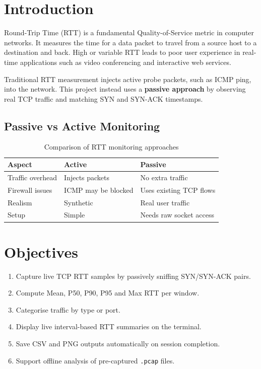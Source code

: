 \documentclass[12pt,a4paper]{article}
\begin{document}
\section{Introduction}

Round-Trip Time (RTT) is a fundamental Quality-of-Service metric in
computer networks. It measures the time for a data packet to travel from a
source host to a destination and back. High or variable RTT leads to poor user
experience in real-time applications such as video conferencing and interactive
web services.

Traditional RTT measurement injects active probe packets, such as ICMP ping,
into the network. This project instead uses a \textbf{passive approach} by
observing real TCP traffic and matching SYN and SYN-ACK timestamps.

\subsection{Passive vs Active Monitoring}

\begin{table}[H]
    \centering
    \caption{Comparison of RTT monitoring approaches}
    \begin{tabularx}{\textwidth}{lXX}
        \toprule
        \textbf{Aspect} & \textbf{Active} & \textbf{Passive} \\
        \midrule
        Traffic overhead & Injects packets & No extra traffic \\
        Firewall issues & ICMP may be blocked & Uses existing TCP flows \\
        Realism & Synthetic & Real user traffic \\
        Setup & Simple & Needs raw socket access \\
        \bottomrule
    \end{tabularx}
\end{table}

\section{Objectives}

\begin{enumerate}[leftmargin=*]
    \item Capture live TCP RTT samples by passively sniffing SYN/SYN-ACK pairs.
    \item Compute Mean, P50, P90, P95 and Max RTT per window.
    \item Categorise traffic by type or port.
    \item Display live interval-based RTT summaries on the terminal.
    \item Save CSV and PNG outputs automatically on session completion.
    \item Support offline analysis of pre-captured \texttt{.pcap} files.
\end{enumerate}
\end{document}

